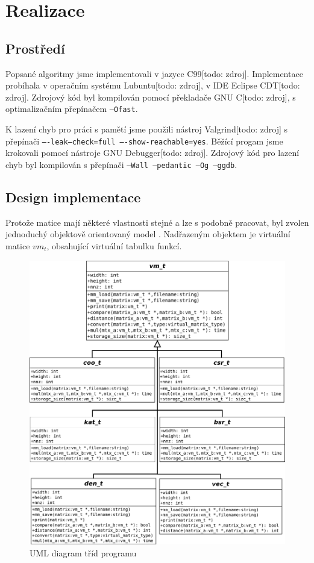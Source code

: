 \chapter{Realizace}

\section{Prostředí}

Popsané algoritmy jsme implementovali v jazyce C99[todo: zdroj]. Implementace probíhala v operačním systému Lubuntu[todo: zdroj], v IDE Eclipse CDT[todo: zdroj]. Zdrojový kód byl kompilován pomocí překladače GNU C[todo: zdroj], s optimalizačním přepínačem \texttt{--Ofast}.

K lazení chyb pro práci s pamětí jsme použili nástroj Valgrind[todo: zdroj] s přepínači \texttt{----leak--check=full ----show-reachable=yes}. Běžící progam jsme krokovali pomocí nástroje GNU Debugger[todo: zdroj]. Zdrojový kód pro lazení chyb byl kompilován s přepínači \texttt{--Wall --pedantic --Og --ggdb}.


\section{Design implementace}

Protože matice mají některé vlastnosti stejné a lze s podobně pracovat, byl zvolen jednoduchý objektově orientovaný model \cite{schreiner1994objektorientierte}. Nadřazeným objektem je virtuální matice $vm_t$, obsahující virtuální tabulku funkcí.
	
\begin{figure}[htb]
	\includegraphics[width=1.0\textwidth]{./images/uml/uml}
	\caption{UML diagram tříd programu}
	\label{fig:uml}
\end{figure}

